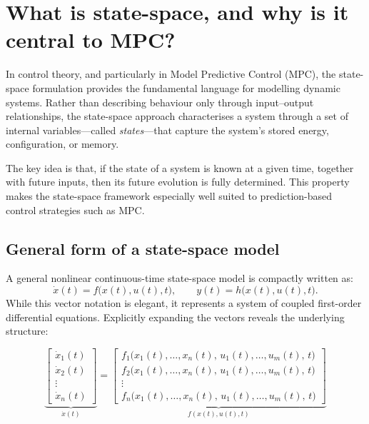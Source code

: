 \section{What is state-space, and why is it central to MPC?}

In control theory, and particularly in Model Predictive Control (MPC), the state-space formulation provides the fundamental language for modelling dynamic systems. Rather than describing behaviour only through input--output relationships, the state-space approach characterises a system through a set of internal variables—called \emph{states}—that capture the system’s stored energy, configuration, or memory.

The key idea is that, if the state of a system is known at a given time, together with future inputs, then its future evolution is fully determined. This property makes the state-space framework especially well suited to prediction-based control strategies such as MPC.

\subsection*{General form of a state-space model}

A general nonlinear continuous-time state-space model is compactly written as:
\[
\dot{x}(t) = f\big(x(t), u(t), t\big), 
\qquad 
y(t) = h\big(x(t), u(t), t\big).
\]
While this vector notation is elegant, it represents a system of coupled first-order differential equations. Explicitly expanding the vectors reveals the underlying structure:

\begin{equation}
	\underbrace{
		\begin{bmatrix}
			\dot{x}_1(t) \\
			\dot{x}_2(t) \\
			\vdots \\
			\dot{x}_n(t)
		\end{bmatrix}
	}_{\dot{x}(t)}
	=
	\underbrace{
		\begin{bmatrix}
			f_1 \big( x_1(t), \dots, x_n(t), \, u_1(t), \dots, u_m(t), \, t \big) \\
			f_2 \big( x_1(t), \dots, x_n(t), \, u_1(t), \dots, u_m(t), \, t \big) \\
			\vdots \\
			f_n \big( x_1(t), \dots, x_n(t), \, u_1(t), \dots, u_m(t), \, t \big)
		\end{bmatrix}
	}_{f(x(t), u(t), t)}
\end{equation}

